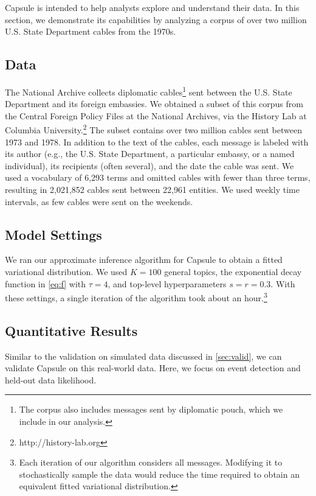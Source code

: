 Capsule is intended to help analysts explore and understand their
data. In this section, we demonstrate its capabilities by analyzing a
corpus of over two million U.S. State Department cables from the
1970s.

\subsection{Data}

The National Archive collects diplomatic cables\footnote{The corpus also includes messages sent by diplomatic pouch, which we include in our analysis.} sent between the
U.S. State Department and its foreign embassies. We obtained a subset
of this corpus from the Central Foreign Policy Files at the National
Archives, via the History Lab at Columbia
University.\footnote{http://history-lab.org} The subset contains over
two million cables sent between 1973 and 1978. In addition to the text
of the cables, each message is labeled with its author (e.g., the
U.S. State Department, a particular embassy, or a named individual),
its recipients (often several), and the date the cable was sent. We
used a vocabulary of 6,293 terms and omitted cables with fewer than
three terms, resulting in 2,021,852 cables sent between 22,961
entities. We used weekly time intervals, as few cables were sent on
the weekends.

\subsection{Model Settings}


We ran our approximate inference algorithm for Capsule to obtain a
fitted variational distribution. We used $K=100$ general topics, the
exponential decay function in \cref{eq:f} with $\tau=4$, and top-level
hyperparameters $s=r=0.3$. With these settings, a single iteration of
the algorithm took about an hour.\footnote{Each iteration of our
  algorithm considers all messages. Modifying it to stochastically
  sample the data would reduce the time required to obtain an
  equivalent fitted variational distribution.}

\subsection{Quantitative Results}

Similar to the validation on simulated data discussed in \cref{sec:valid},
we can validate Capsule on this real-world data.  Here, we focus on event detection
and held-out data likelihood.

